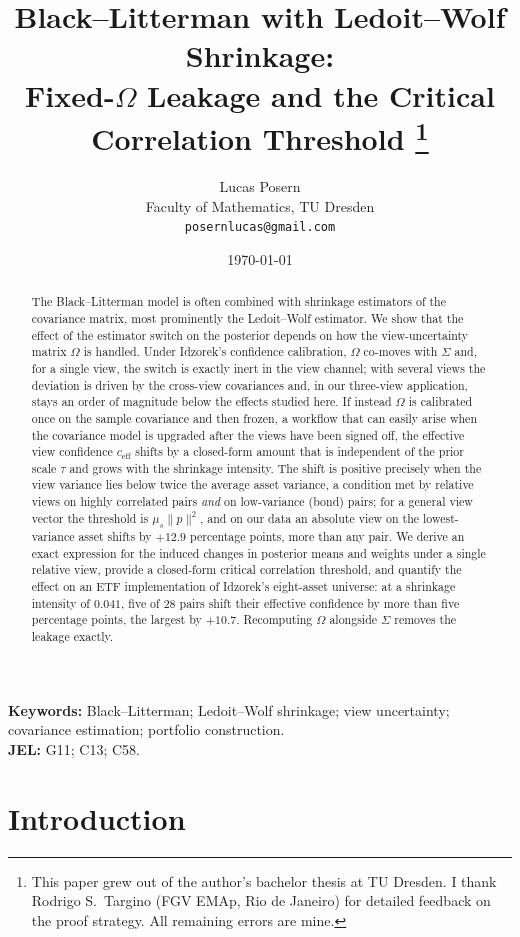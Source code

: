 \documentclass[a4paper,11pt]{article}
\title{Black--Litterman with Ledoit--Wolf Shrinkage:\\
Fixed-$\Omega$ Leakage and the Critical Correlation Threshold%
\thanks{This paper grew out of the author's bachelor thesis at TU Dresden.
I thank Rodrigo S.~Targino (FGV EMAp, Rio de Janeiro) for detailed feedback
on the proof strategy. All remaining errors are mine.}}
\author{Lucas Posern\\
\small Faculty of Mathematics, TU Dresden\\
\small \texttt{posernlucas@gmail.com}}
\date{\today}
\theoremstyle{plain}
\theoremstyle{definition}
\newcommand{\eff}{\mathrm{eff}}
\begin{document}
\maketitle

\begin{abstract}
\noindent
The Black--Litterman model is often combined with shrinkage estimators
of the covariance matrix, most prominently the Ledoit--Wolf estimator.
We show that the effect of the estimator switch on the posterior depends
on how the view-uncertainty matrix $\Omega$ is handled. Under
Idzorek's confidence calibration, $\Omega$ co-moves with $\Sigma$ and, for
a single view, the switch is exactly inert in the view channel; with
several views the deviation is driven by the cross-view covariances
and, in our three-view application, stays an order of magnitude below
the effects studied here. If instead
$\Omega$ is calibrated once on the sample covariance and then frozen, a
workflow that can easily arise when the covariance model is upgraded after
the views have been signed off, the effective view confidence
$c_{\eff}$ shifts by a closed-form amount that is independent of the prior
scale $\tau$ and grows with the shrinkage intensity. The shift is positive
precisely when the view variance lies below twice the average asset
variance, a condition met by relative views on highly correlated pairs
\emph{and} on low-variance (bond) pairs; for a general view vector the
threshold is $\mu_s\lVert p\rVert^2$, and on our data an absolute view
on the lowest-variance asset shifts by $+12.9$ percentage points, more
than any pair. We derive an exact expression for
the induced changes in posterior means and weights under a single relative
view, provide a closed-form critical correlation threshold, and quantify
the effect on an ETF implementation of Idzorek's eight-asset universe: at
a shrinkage intensity of $0.041$, five of 28 pairs shift their effective
confidence by more than five percentage points, the largest by $+10.7$.
Recomputing $\Omega$ alongside $\Sigma$ removes the leakage exactly.
\end{abstract}

\medskip
\noindent\textbf{Keywords:} Black--Litterman; Ledoit--Wolf shrinkage;
view uncertainty; covariance estimation; portfolio construction.\\
\textbf{JEL:} G11; C13; C58.

\section{Introduction}
\label{sec:intro}
\end{document}
